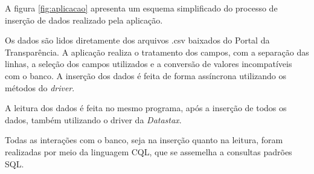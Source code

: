 A figura \ref{fig:aplicacao} apresenta um esquema simplificado do processo de inserção de dados realizado pela aplicação. 

Os dados são lidos diretamente dos arquivos .csv baixados do Portal da Transparência. A aplicação realiza o tratamento dos campos, com a separação das linhas, a seleção dos campos utilizados e a conversão de valores incompatíveis com o banco. A inserção dos dados é feita de forma assíncrona utilizando os métodos do \emph{driver}. 

A leitura dos dados é feita no mesmo programa, após a inserção de todos os dados, também utilizando o driver da \emph{Datastax}.

Todas as interações com o banco, seja na inserção quanto na leitura, foram realizadas por meio da linguagem CQL, que se assemelha a consultas padrões SQL.


